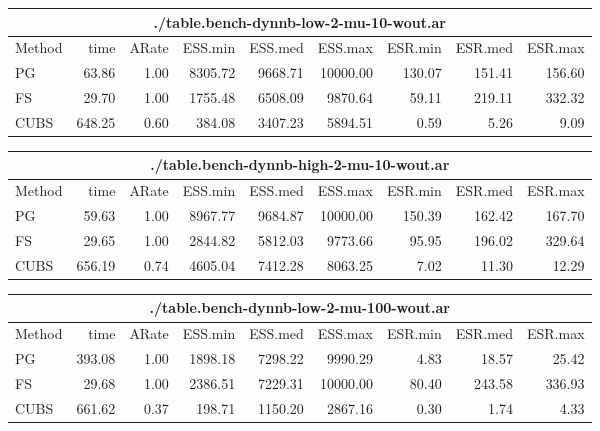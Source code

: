 \documentclass[11pt]{article}
\begin{document}
\begin{table}
\begin{tabular}{l r r r r r r r r } 
\hline
\multicolumn{9}{c}{./table.bench-dynnb-low-2-mu-10-wout.ar} \\
\hline
          Method  &     time &    ARate &  ESS.min &  ESS.med &  ESS.max &  ESR.min &  ESR.med &  ESR.max \\ 
              PG  &    63.86 &     1.00 &  8305.72 &  9668.71 & 10000.00 &   130.07 &   151.41 &   156.60 \\ 
              FS  &    29.70 &     1.00 &  1755.48 &  6508.09 &  9870.64 &    59.11 &   219.11 &   332.32 \\ 
            CUBS  &   648.25 &     0.60 &   384.08 &  3407.23 &  5894.51 &     0.59 &     5.26 &     9.09
 \end{tabular}

\begin{tabular}{l r r r r r r r r } 
\hline
\multicolumn{9}{c}{./table.bench-dynnb-high-2-mu-10-wout.ar} \\
\hline
          Method  &     time &    ARate &  ESS.min &  ESS.med &  ESS.max &  ESR.min &  ESR.med &  ESR.max \\ 
              PG  &    59.63 &     1.00 &  8967.77 &  9684.87 & 10000.00 &   150.39 &   162.42 &   167.70 \\ 
              FS  &    29.65 &     1.00 &  2844.82 &  5812.03 &  9773.66 &    95.95 &   196.02 &   329.64 \\ 
            CUBS  &   656.19 &     0.74 &  4605.04 &  7412.28 &  8063.25 &     7.02 &    11.30 &    12.29
 \end{tabular}

\begin{tabular}{l r r r r r r r r } 
\hline
\multicolumn{9}{c}{./table.bench-dynnb-low-2-mu-100-wout.ar} \\
\hline
          Method  &     time &    ARate &  ESS.min &  ESS.med &  ESS.max &  ESR.min &  ESR.med &  ESR.max \\ 
              PG  &   393.08 &     1.00 &  1898.18 &  7298.22 &  9990.29 &     4.83 &    18.57 &    25.42 \\ 
              FS  &    29.68 &     1.00 &  2386.51 &  7229.31 & 10000.00 &    80.40 &   243.58 &   336.93 \\ 
            CUBS  &   661.62 &     0.37 &   198.71 &  1150.20 &  2867.16 &     0.30 &     1.74 &     4.33
 \end{tabular}



\end{table}
\end{document}
